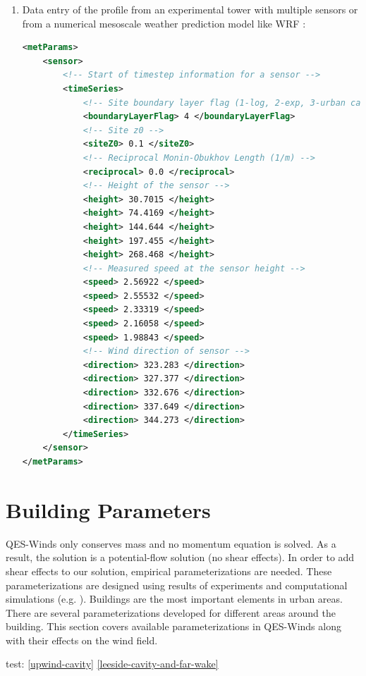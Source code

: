 \begin{enumerate}
\item Data entry of the profile from an experimental tower with multiple sensors or from a numerical mesoscale weather prediction model like WRF \cite{powers2017weather}:

\begin{lstlisting}[language=XML]
<metParams>
	<sensor>
		<!-- Start of timestep information for a sensor -->
		<timeSeries>						
			<!-- Site boundary layer flag (1-log, 2-exp, 3-urban canopy, 4-data entry) -->    
			<boundaryLayerFlag> 4 </boundaryLayerFlag>
			<!-- Site z0 -->
			<siteZ0> 0.1 </siteZ0>
			<!-- Reciprocal Monin-Obukhov Length (1/m) --> 									
			<reciprocal> 0.0 </reciprocal>
			<!-- Height of the sensor -->
			<height> 30.7015 </height>
			<height> 74.4169 </height>
			<height> 144.644 </height>
			<height> 197.455 </height>
			<height> 268.468 </height>
			<!-- Measured speed at the sensor height -->
			<speed> 2.56922 </speed> 							
			<speed> 2.55532 </speed>
			<speed> 2.33319 </speed>
			<speed> 2.16058 </speed>
			<speed> 1.98843 </speed>
			<!-- Wind direction of sensor -->
			<direction> 323.283 </direction> 					
			<direction> 327.377 </direction>
			<direction> 332.676 </direction>
			<direction> 337.649 </direction>
			<direction> 344.273 </direction>
		</timeSeries>
	</sensor>
</metParams>
\end{lstlisting}

\end{enumerate}

\section{Building Parameters}

QES-Winds only conserves mass and no momentum equation is solved. As a result, the solution is a potential-flow solution (no shear effects). In order to add shear effects to our solution, empirical parameterizations are needed. These parameterizations are designed using results of experiments and computational simulations (e.g. \cite{singh2008evaluation,brown2013quic}). Buildings are the most important elements in urban areas. There are several parameterizations developed for different areas around the building. This section covers available parameterizations in QES-Winds along with their effects on the wind field.

test: \autoref{upwind-cavity} \autoref{leeside-cavity-and-far-wake}

